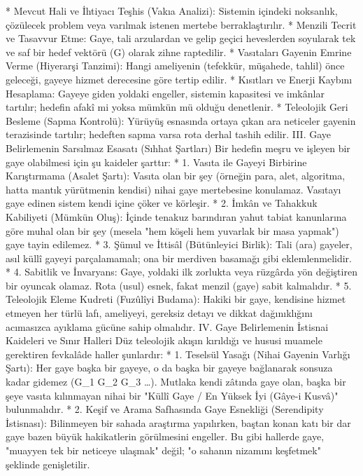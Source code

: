 \documentclass[11pt,a4paper]{article}
\begin{document}
 * Mevcut Hali ve İhtiyacı Teşhis (Vakıa Analizi): Sistemin içindeki noksanlık, çözülecek problem veya varılmak istenen mertebe berraklaştırılır.
 * Menzili Tecrit ve Tasavvur Etme: Gaye, tali arzulardan ve gelip geçici heveslerden soyularak tek ve saf bir hedef vektörü (G) olarak zihne raptedilir.
 * Vasıtaları Gayenin Emrine Verme (Hiyerarşi Tanzimi): Hangi ameliyenin (tefekkür, müşahede, tahlil) önce geleceği, gayeye hizmet derecesine göre tertip edilir.
 * Kısıtları ve Enerji Kaybını Hesaplama: Gayeye giden yoldaki engeller, sistemin kapasitesi ve imkânlar tartılır; hedefin afakî mi yoksa mümkün mü olduğu denetlenir.
 * Teleolojik Geri Besleme (Sapma Kontrolü): Yürüyüş esnasında ortaya çıkan ara neticeler gayenin terazisinde tartılır; hedeften sapma varsa rota derhal tashih edilir.
III. Gaye Belirlemenin Sarsılmaz Esasatı (Sıhhat Şartları)
Bir hedefin meşru ve işleyen bir gaye olabilmesi için şu kaideler şarttır:
 * 1. Vasıta ile Gayeyi Birbirine Karıştırmama (Asalet Şartı):
   Vasıta olan bir şey (örneğin para, alet, algoritma, hatta mantık yürütmenin kendisi) nihai gaye mertebesine konulamaz. Vasıtayı gaye edinen sistem kendi içine çöker ve körleşir.
 * 2. İmkân ve Tahakkuk Kabiliyeti (Mümkün Oluş):
   İçinde tenakuz barındıran yahut tabiat kanunlarına göre muhal olan bir şey (mesela "hem köşeli hem yuvarlak bir masa yapmak") gaye tayin edilemez.
 * 3. Şümul ve İttisâl (Bütünleyici Birlik):
   Tali (ara) gayeler, asıl küllî gayeyi parçalamamalı; ona bir merdiven basamağı gibi eklemlenmelidir.
 * 4. Sabitlik ve İnvaryans:
   Gaye, yoldaki ilk zorlukta veya rüzgârda yön değiştiren bir oyuncak olamaz. Rota (usul) esnek, fakat menzil (gaye) sabit kalmalıdır.
 * 5. Teleolojik Eleme Kudreti (Fuzûlîyi Budama):
   Hakiki bir gaye, kendisine hizmet etmeyen her türlü lafı, ameliyeyi, gereksiz detayı ve dikkat dağınıklığını acımasızca ayıklama gücüne sahip olmalıdır.
IV. Gaye Belirlemenin İstisnai Kaideleri ve Sınır Halleri
Düz teleolojik akışın kırıldığı ve hususi muamele gerektiren fevkalâde haller şunlardır:
 * 1. Teselsül Yasağı (Nihai Gayenin Varlığı Şartı):
   Her gaye başka bir gayeye, o da başka bir gayeye bağlanarak sonsuza kadar gidemez (G_1 \to G_2 \to G_3 \dots \infty). Mutlaka kendi zâtında gaye olan, başka bir şeye vasıta kılınmayan nihai bir "Küllî Gaye / En Yüksek İyi (Gâye-i Kusvâ)" bulunmalıdır.
 * 2. Keşif ve Arama Safhasında Gaye Esnekliği (Serendipity İstisnası):
   Bilinmeyen bir sahada araştırma yapılırken, baştan konan katı bir dar gaye bazen büyük hakikatlerin görülmesini engeller. Bu gibi hallerde gaye, "muayyen tek bir neticeye ulaşmak" değil; "o sahanın nizamını keşfetmek" şeklinde genişletilir.
\end{document}
